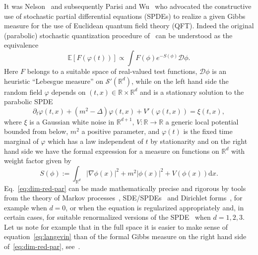 \documentclass[a4paper,10pt]{article}
\newcommand{\assign}{:=}
\newcommand{\mathd}{\mathrm{d}}
\begin{document}
It was Nelson~{\cite{nelson1966,MR0214150,Nelson1973}} and subsequently
Parisi and Wu~{\cite{parisi_perturbation_1981}} who advocated the constructive
use of stochastic partial differential equations (SPDEs) to realize a given
Gibbs measure for the use of Euclidean quantum field theory (QFT). Indeed the
original (parabolic) stochastic quantization procedure
of~{\cite{parisi_perturbation_1981}} can be understood as the equivalence
\begin{equation}
  \mathbb{E} [F (\varphi (t))] \propto \int F (\phi) e^{- S (\phi)}
  \mathcal{D} \phi \label{eq:dim-red-par} .
\end{equation}
Here $F$ belongs to a suitable space of real-valued test functions,
$\mathcal{D} \phi$ is an heuristic ``Lebesgue measure'' on $\mathcal{S}'
(\mathbb{R}^d)$, while on the left hand side the random field $\varphi$
depends on $(t, x) \in \mathbb{R} \times \mathbb{R}^d$ and is a stationary
solution to the parabolic SPDE
\begin{equation}
  \partial_t \varphi (t, x) + (m^2 - \Delta) \varphi (t, x) + V' (\varphi (t,
  x)) = \xi (t, x) \label{eq:langevin},
\end{equation}
where $\xi$ is a Gaussian white noise in $\mathbb{R}^{d + 1}$, $V : \mathbb{R}
\rightarrow \mathbb{R}$ a generic local potential bounded from below, $m^2$ a
positive parameter, and $\varphi (t)$ is the fixed time marginal of $\varphi$
which has a law independent of $t$ by stationarity and on the right hand side
we have the formal expression for a measure on functions on $\mathbb{R}^d$
with weight factor given by
\begin{equation}
  S (\phi) \assign \int_{\mathbb{R}^d} | \nabla \phi (x) |^2 + m^2 | \phi (x)
  |^2 + V (\phi (x)) \mathd x. \label{eq:action}
\end{equation}
Eq.~{\eqref{eq:dim-red-par}} can be made mathematically precise and rigorous
by tools from the theory of Markov
processes~{\cite{da_prato_stochastic_2008,krylov_stochastic_1999,prato_kolmogorov_2005}},
SDE/SPDEs~{\cite{khasminskii_stochastic_2011,Albeverio2017,MR2768734,Ugolini2011}}
and Dirichlet forms~{\cite{albeverio_stochastic_1991}}, for example when $d =
0$, or when the equation is regularized appropriately and, in certain cases,
for suitable renormalized versions of the
SPDE~{\cite{Albeverio2002,albeverio_invariant_2017,Gallavotti1980,borkar_stochastic_1988,da_prato_strong_2003,GH18,hairer_discretisations_2018,hairer_tightness_2018,jona-lasinio_stochastic_1985,MW17,albeverio_strong_2012,iwata_infinite_1987}}
when $d = 1, 2, 3$. Let us note for example that in the full space it is
easier to make sense of equation~{\eqref{eq:langevin}} than of the formal
Gibbs measure on the right hand side of~{\eqref{eq:dim-red-par}},
see~{\cite{GH18}}.
\end{document}
